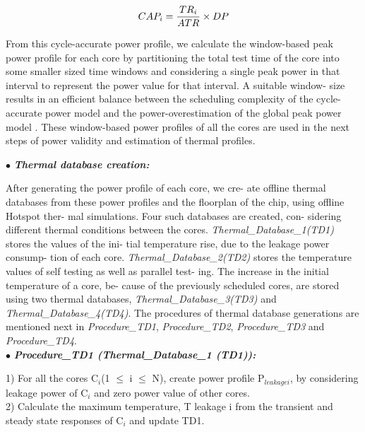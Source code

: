 \documentclass[conference]{IEEEtran}
\begin{document}
\begin{equation}
CAP_{i} = \frac{TR_{i}}{ATR} \times DP\\
\end{equation}

From this cycle-accurate power profile, we calculate the
window-based peak power profile for each core by partitioning
the total test time of the core into some smaller sized time
windows and considering a single peak power in that interval to
represent the power value for that interval. A suitable window-
size results in an efficient balance between the scheduling
complexity of the cycle-accurate power model \cite{samii2008cycle} and the
power-overestimation of the global peak power model \cite{chou1997scheduling}.
These window-based power profiles of all the cores are used
in the next steps of power validity and estimation of thermal
profiles.


$\bullet$ \hspace{1 cm} \textbf{\textit{Thermal database creation:}}

	\par
	After generating the power profile of each core, we cre-
ate offline thermal databases from these power profiles
and the floorplan of the chip, using offline Hotspot ther-
mal simulations. Four such databases are created, con-
sidering different thermal conditions between the cores.
\textit{Thermal\_Database\_1(TD1)} stores the values of the ini-
tial temperature rise, due to the leakage power consump-
tion of each core. \textit{Thermal\_Database\_2(TD2)} stores the
temperature values of self testing as well as parallel test-
ing. The increase in the initial temperature of a core, be-
cause of the previously scheduled cores, are stored using
two thermal databases, \textit{Thermal\_Database\_3(TD3)} and
\textit{Thermal\_Database\_4(TD4)}. The procedures of thermal
database generations are mentioned next in \textit{Procedure\_TD1},
\textit{Procedure\_TD2}, \textit{Procedure\_TD3} and \textit{Procedure\_TD4}.\\

$\bullet$ \textbf{\textit{Procedure\_TD1 (Thermal\_Database\_1 (TD1)):}}

	\par
	1) For all the cores C$_{i}$(1 $\leq$ i $\leq$ N), create power profile
P$_{leakagei}$, by considering leakage power of C$_{i}$ and zero
power value of other cores.\\
\hspace*{.33 cm}2) Calculate the maximum temperature, T leakage i from the
transient and steady state responses of C$_{i}$ and update TD1.\\
\end{document}
